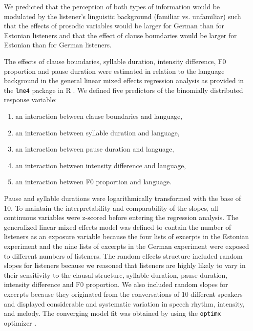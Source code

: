 \documentclass[output=paper]{langscibook}
\begin{document}
    We predicted that the perception of both types of information would be modulated by the listener’s linguistic background (familiar vs. unfamiliar) such that the effects of prosodic variables would be larger for German than for Estonian listeners and that the effect of clause boundaries would be larger for Estonian than for German listeners.

    The effects of clause boundaries, syllable duration, intensity difference, F0 proportion and pause duration were estimated in relation to the language background in the general linear mixed effects regression analysis as provided in the \texttt{lme4} package \citep{batesEtAl2015} in R \citep{rWare}. We defined five predictors of the binomially distributed response variable:\largerpage
    
    \begin{enumerate}
	    \item an interaction between clause boundaries and language,
	    \item an interaction between syllable duration and language, 
	    \item an interaction between pause duration and language, 
	    \item an interaction between intensity difference and language,
	    \item an interaction between F0 proportion and language. 
    \end{enumerate}

    Pause and syllable durations were logarithmically transformed with the base of 10. To maintain the interpretability and comparability of the slopes, all continuous variables were z-scored before entering the regression analysis. The generalized linear mixed effects model was defined to contain the number of listeners as an exposure variable because the four lists of excerpts in the Estonian experiment and the nine lists of excerpts in the German experiment were exposed to different numbers of listeners. The random effects structure included random slopes for listeners because we reasoned that listeners are highly likely to vary in their sensitivity to the clausal structure, syllable duration, pause duration, intensity difference and F0 proportion. We also included random slopes for excerpts because they originated from the conversations of 10 different speakers and displayed considerable and systematic variation in speech rhythm, intensity, and melody. The converging model fit was obtained by using the \texttt{optimx} optimizer \citep[][]{nash2014, nashVaradhan2011}.
    
\end{document}
